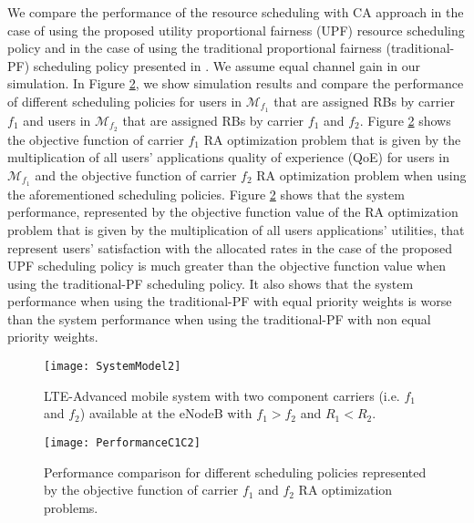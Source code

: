 \documentclass[conference]{IEEEtran}
\begin{document}
We compare the performance of the resource scheduling with CA approach in the case of using the proposed utility proportional fairness (UPF) resource scheduling policy and in the case of using the traditional proportional fairness (traditional-PF) scheduling policy presented in \cite{SelfOrganizedLTE}. We assume equal channel gain in our simulation. In Figure \ref{fig:PerformanceC1C2}, we show simulation results and compare the performance of different scheduling policies for users in $\mathcal{M}_{f_1}$ that are assigned RBs by carrier $f_1$ and users in $\mathcal{M}_{f_2}$ that are assigned RBs by carrier $f_1$ and $f_2$. Figure \ref{fig:PerformanceC1C2} shows the objective function of carrier $f_1$ RA optimization problem that is given by the multiplication of all users' applications quality of experience (QoE) for users in $\mathcal{M}_{f_1}$ and the objective function of carrier $f_2$ RA optimization problem when using the aforementioned scheduling policies. Figure \ref{fig:PerformanceC1C2} shows that the system performance, represented by the objective function value of the RA optimization problem that is given by the multiplication of all users applications' utilities, that represent users' satisfaction with the allocated rates in the case of the proposed UPF scheduling policy is much greater than the objective function value when using the traditional-PF scheduling policy. It also shows that the system performance when using the traditional-PF with equal priority weights is worse than the system performance when using the traditional-PF with non equal priority weights.
\begin{figure}
\centering
\vspace{-1em}
\texttt{[image: SystemModel2]}
\vspace{-1em}
\caption{LTE-Advanced mobile system with two component carriers (i.e. $f_1$ and $f_2$) available at the eNodeB with $f_1>f_2$ and $R_1<R_2$.}
\vspace{-0.2em}
\label{fig:SystemModel2}
\end{figure}
\begin{figure}
\centering
\vspace{-1em}
\texttt{[image: PerformanceC1C2]}
\vspace{-1.5em}
\caption{Performance comparison for different scheduling policies represented by the objective function of carrier $f_1$ and $f_2$ RA optimization problems.}
\vspace{-1.2em}
\label{fig:PerformanceC1C2}
\end{figure}
\end{document}
